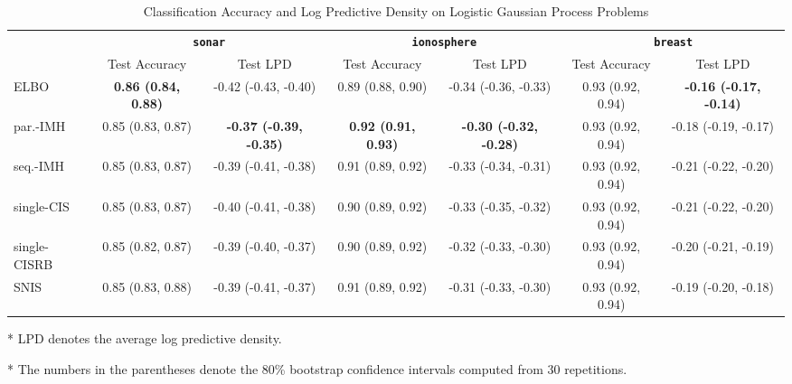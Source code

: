 
\begin{table*}
  \centering
  \caption{Classification Accuracy and Log Predictive Density on Logistic Gaussian Process Problems}\label{table:gp}
  \setlength{\tabcolsep}{3pt}
  \begin{threeparttable}
  \begin{tabular}{lcccccc}
    \toprule
     & \multicolumn{2}{c}{\textbf{\texttt{sonar}}} & \multicolumn{2}{c}{\textbf{\texttt{ionosphere}}} & \multicolumn{2}{c}{\textbf{\texttt{breast}}} \\
    \cmidrule(lr){2-3}\cmidrule(lr){4-5}\cmidrule(lr){6-7}
    & Test Accuracy & Test LPD
    & Test Accuracy & Test LPD
    & Test Accuracy & Test LPD \\\midrule
    ELBO & \textbf{0.86 {\scriptsize(0.84, 0.88)}} & -0.42 {\scriptsize(-0.43, -0.40)} & 0.89 {\scriptsize(0.88, 0.90)} & -0.34 {\scriptsize(-0.36, -0.33)} & 0.93 {\scriptsize(0.92, 0.94)} & \textbf{-0.16 {\scriptsize(-0.17, -0.14)}}  \\\arrayrulecolor{black!30}\midrule
    par.-IMH & 0.85 {\scriptsize(0.83, 0.87)} & \textbf{-0.37 {\scriptsize(-0.39, -0.35)}} & \textbf{0.92 {\scriptsize(0.91, 0.93)}} & \textbf{-0.30 {\scriptsize(-0.32, -0.28)}} & 0.93 {\scriptsize(0.92, 0.94)} & -0.18 {\scriptsize(-0.19, -0.17)} \\
    seq.-IMH & 0.85 {\scriptsize(0.83, 0.87)} & -0.39 {\scriptsize(-0.41, -0.38)} & 0.91 {\scriptsize(0.89, 0.92)} & -0.33 {\scriptsize(-0.34, -0.31)} & 0.93 {\scriptsize(0.92, 0.94)} & -0.21 {\scriptsize(-0.22, -0.20)} \\
    single-CIS & 0.85 {\scriptsize(0.83, 0.87)} & -0.40 {\scriptsize(-0.41, -0.38)} & 0.90 {\scriptsize(0.89, 0.92)} & -0.33 {\scriptsize(-0.35, -0.32)} & 0.93 {\scriptsize(0.92, 0.94)} & -0.21 {\scriptsize(-0.22, -0.20)} \\
    single-CISRB & 0.85 {\scriptsize(0.82, 0.87)} & -0.39 {\scriptsize(-0.40, -0.37)} & 0.90 {\scriptsize(0.89, 0.92)} & -0.32 {\scriptsize(-0.33, -0.30)} & 0.93 {\scriptsize(0.92, 0.94)} & -0.20 {\scriptsize(-0.21, -0.19)} \\
    SNIS & 0.85 {\scriptsize(0.83, 0.88)} & -0.39 {\scriptsize(-0.41, -0.37)} & 0.91 {\scriptsize(0.89, 0.92)} & -0.31 {\scriptsize(-0.33, -0.30)} & 0.93 {\scriptsize(0.92, 0.94)} & -0.19 {\scriptsize(-0.20, -0.18)} \\\bottomrule
  \end{tabular}
  \begin{tablenotes}
    \item[*]{\footnotesize LPD denotes the average log predictive density.}
    \item[*]{\footnotesize The numbers in the parentheses denote the 80\% bootstrap confidence intervals computed from 30 repetitions.}
  \end{tablenotes}
  \end{threeparttable}
\end{table*}

